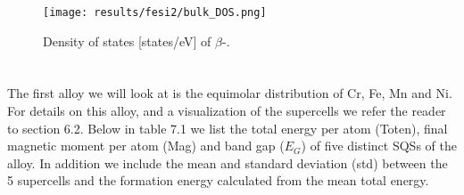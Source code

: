 \begin{figure}[H]
\centering
\texttt{[image: results/fesi2/bulk\_DOS.png]}
\caption{Density of states [states/eV] of $\beta$-.}
\end{figure}
 

\section{}
The first alloy we will look at is the equimolar distribution of Cr, Fe, Mn and Ni. For details on this alloy, and a visualization of the supercells we refer the reader to section 6.2. Below in table 7.1 we list the total energy per atom (Toten), final magnetic moment per atom (Mag) and band gap ($E_G$) of five distinct SQSs of the  alloy. In addition we include the mean and standard deviation (std) between the 5 supercells and the formation energy calculated from the mean total energy. 
 

